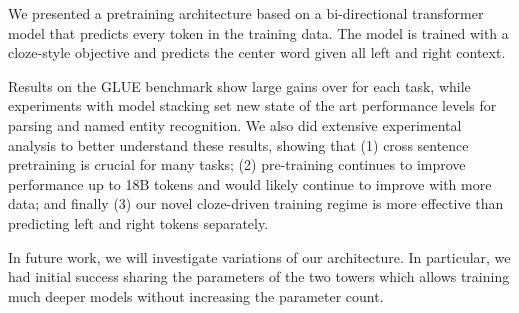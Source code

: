 \documentclass[11pt,a4paper]{article}
\begin{document}
We presented a pretraining architecture based on a bi-directional transformer model that predicts every token in the training data.
The model is trained with a cloze-style objective and predicts the center word given all left and right context.

Results on the GLUE benchmark show large gains over \citet{radford2018unsup} for each task, while experiments with model stacking set new state of the art performance levels for parsing and named entity recognition. We also did extensive experimental analysis to better understand these results, showing that (1)  cross sentence pretraining is crucial for many tasks; (2) pre-training continues to improve performance up to 18B tokens and would likely continue to improve with more data; and finally (3) our novel cloze-driven training regime is more effective than predicting left and right tokens separately.

In future work, we will investigate variations of our architecture. In particular, we had initial success sharing the parameters of the two towers which allows training much deeper models without increasing the parameter count.




\end{document}

